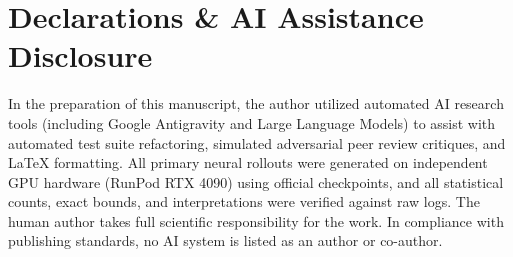 \documentclass[10pt,conference]{IEEEtran}
\begin{document}
\section*{Declarations \& AI Assistance Disclosure}
In the preparation of this manuscript, the author utilized automated AI research tools (including Google Antigravity and Large Language Models) to assist with automated test suite refactoring, simulated adversarial peer review critiques, and LaTeX formatting. All primary neural rollouts were generated on independent GPU hardware (RunPod RTX 4090) using official checkpoints, and all statistical counts, exact bounds, and interpretations were verified against raw logs. The human author takes full scientific responsibility for the work. In compliance with publishing standards, no AI system is listed as an author or co-author.



\end{document}
